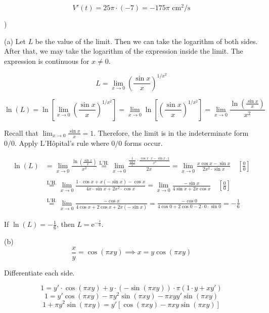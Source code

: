 \documentclass{article}
\begin{document}
\[V'(t)=25\pi\cdot(-7)=\boxed{-175\pi\text{ cm}^2\text{/s}}\]

\hfill

)

\hfill

\noindent (a) Let $L$ be the value of the limit. Then we can take the logarithm of both sides. After that, we may take the logarithm of the expression inside the limit. The expression is continuous for $x\neq0$.

\[L=\lim_{x\to0}\left(\frac{\sin x}x\right)^{1/x^2}\]

\[\ln(L) = \ln\left[\lim_{x\to0}\left(\frac{\sin x}x\right)^{1/x^2}\right]=\lim_{x\to0}\ln\left[\left(\frac{\sin x}x\right)^{1/x^2}\right]=\lim_{x\to0}\frac{\ln\left(\frac{\sin x}x\right)}{x^2}\]

\hfill

\noindent Recall that $\displaystyle \lim_{x\to0}\frac{\sin x}x=1$. Therefore, the limit is in the indeterminate form $0/0$. Apply L'Hôpital's rule where $0/0$ forms occur.

\begin{align*}
\ln(L)&=\lim_{x\to0}\frac{\ln\left(\frac{\sin x}x\right)}{x^2}\overset{\text{L'H.}}{=}\lim_{x\to0}\frac{\displaystyle\frac1{\frac{\sin x}x}\cdot\frac{\cos x\cdot x-\sin x\cdot1}{x^2}}{2x}=\lim_{x\to0}\frac{x\cos x-\sin x}{2x^2\cdot\sin x}\quad\left[\frac00\right]\\\\&\overset{\text{L'H.}}{=}\lim_{x\to0}\frac{1\cdot\cos x+x(-\sin x)-\cos x}{4x\cdot\sin x+2x^2\cdot\cos x}=\lim_{x\to0}\frac{-\sin x}{4\sin x+2x\cos x}\quad\left[\frac00\right]\\\\&\overset{\text{L'H.}}{=}\lim_{x\to0}\frac{-\cos x}{4\cos x+2\cos x+2x(-\sin x)}=\frac{-\cos0}{4\cos0+2\cos0-2\cdot0\cdot\sin0}=-\frac16
\end{align*}

\noindent If $\displaystyle \ln(L)=-\frac16$, then $\boxed{L=\mathrm{e}^{\textstyle-\frac16}}$.

\hfill

\noindent (b)
\[\frac xy=\cos(\pi xy)\implies x=y\cos(\pi xy)\]

\hfill

\noindent Differentiate each side.

\[1=y'\cdot\cos(\pi xy)+y\cdot(-\sin(\pi xy))\cdot\pi(1\cdot y+xy')\]
\[1=y'\cos(\pi xy)-\pi y^2\sin(\pi xy)-\pi xyy'\sin(\pi xy)\]
\[1+\pi y^2\sin(\pi xy)=y'\left[\cos(\pi xy)-\pi xy\sin(\pi xy)\right]\]
\end{document}
